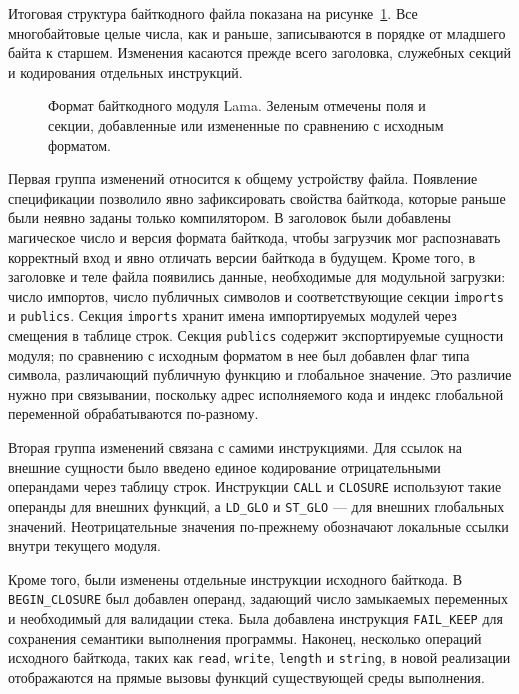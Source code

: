Итоговая структура байткодного файла показана на
рисунке~\ref{fig:bytecode-format}. Все многобайтовые целые числа, как и раньше,
записываются в порядке от младшего байта к старшем. Изменения касаются прежде
всего заголовка, служебных секций и кодирования отдельных инструкций.

\begin{figure}[H]
    \centering
    \resizebox{\textwidth}{!}{}
    \caption{Формат байткодного модуля Lama. Зеленым отмечены поля и секции, добавленные или измененные по сравнению с исходным форматом.}
    \label{fig:bytecode-format}
\end{figure}

Первая группа изменений относится к общему устройству файла. Появление
спецификации позволило явно зафиксировать свойства байткода, которые раньше
были неявно заданы только компилятором. В заголовок были
добавлены магическое число и версия формата байткода, чтобы загрузчик мог
распознавать корректный вход и явно отличать версии байткода в будущем.
Кроме того, в заголовке и теле файла появились данные, необходимые для
модульной загрузки: число импортов, число публичных символов и соответствующие
секции \verb=imports= и \verb=publics=. Секция \verb=imports= хранит имена
импортируемых модулей через смещения в таблице строк. Секция \verb=publics=
содержит экспортируемые сущности модуля; по сравнению с исходным форматом в нее
был добавлен флаг типа символа, различающий публичную функцию и глобальное
значение. Это различие нужно при связывании, поскольку адрес исполняемого кода
и индекс глобальной переменной обрабатываются по-разному.

Вторая группа изменений связана с самими инструкциями. Для ссылок на внешние
сущности было введено единое кодирование отрицательными операндами через
таблицу строк. Инструкции \verb=CALL= и \verb=CLOSURE= используют такие
операнды для внешних функций, а \verb=LD_GLO= и \verb=ST_GLO= --- для внешних
глобальных значений. Неотрицательные значения по-прежнему обозначают локальные
ссылки внутри текущего модуля.

Кроме того, были изменены отдельные инструкции исходного байткода. В \verb=BEGIN_CLOSURE= был
добавлен операнд, задающий число замыкаемых переменных и необходимый для валидации стека. Была добавлена инструкция \verb=FAIL_KEEP= для сохранения семантики выполнения программы. Наконец, несколько операций исходного байткода,
таких как \verb=read=, \verb=write=, \verb=length= и \verb=string=, в новой реализации отображаются
на прямые вызовы функций существующей среды выполнения.

